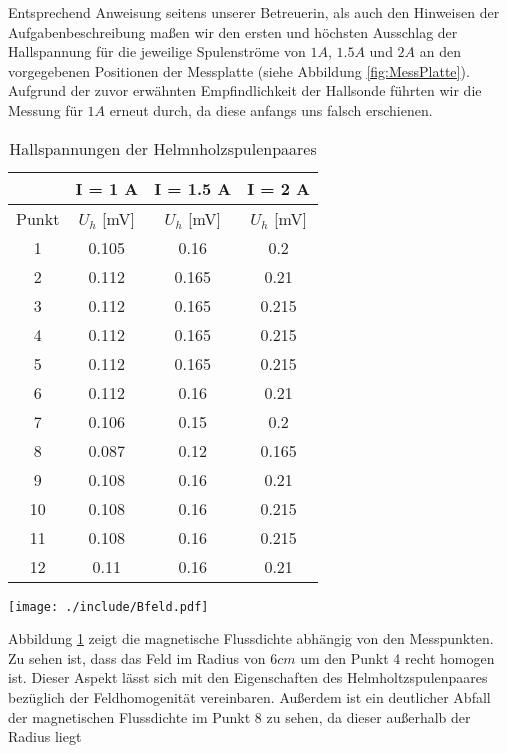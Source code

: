 Entsprechend Anweisung seitens unserer Betreuerin, als auch den Hinweisen der Aufgabenbeschreibung maßen wir den ersten und höchsten Ausschlag der Hallspannung für die jeweilige Spulenströme von $1 A$, $1.5 A$ und $2 A$ an den vorgegebenen Positionen der Messplatte (siehe Abbildung \ref{fig:MessPlatte}). Aufgrund der zuvor erwähnten  Empfindlichkeit der  Hallsonde führten wir die Messung für $1 A$ erneut durch, da diese anfangs uns falsch erschienen.


\newpage
 

\begin{table}
\begin{center}
\begin{tabular}{|c|c|c|c|}
\hline 
& I = 1 A & I = 1.5 A & I = 2 A \\ 
\hline 
Punkt & $U_h$ [mV] & $U_h$ [mV] & $U_h$ [mV] \\ 
\hline 
1 & 0.105 & 0.16 & 0.2 \\ 
\hline 
2 & 0.112 & 0.165 & 0.21 \\ 
\hline 
3 & 0.112 & 0.165 & 0.215 \\ 
\hline 
4 & 0.112 & 0.165 & 0.215 \\ 
\hline 
5 & 0.112 & 0.165 & 0.215 \\ 
\hline 
6 & 0.112 & 0.16 & 0.21 \\ 
\hline 
7 & 0.106 & 0.15 & 0.2 \\ 
\hline 
8 & 0.087 & 0.12 & 0.165 \\ 
\hline 
9 & 0.108 & 0.16 & 0.21 \\ 
\hline 
10 & 0.108 & 0.16 & 0.215 \\ 
\hline 
11 & 0.108 & 0.16 & 0.215 \\ 
\hline 
12 & 0.11 & 0.16 & 0.21 \\ 
\hline 
\end{tabular} 
\caption{Hallspannungen der Helmnholzspulenpaares}
\end{center}
\label{tab:Hallspanungen}
\end{table}

\begin{center}                                       
  \texttt{[image: ./include/Bfeld.pdf]} 
                          
\end{center} 

Abbildung \ref{tab:Hallspanungen} zeigt die magnetische Flussdichte abhängig von den Messpunkten. Zu sehen ist, dass das Feld im Radius von $6 cm$ um den Punkt 4 recht homogen ist. Dieser Aspekt lässt sich mit den Eigenschaften des Helmholtzspulenpaares bezüglich der Feldhomogenität vereinbaren. Außerdem ist ein deutlicher Abfall der magnetischen Flussdichte im Punkt 8 zu sehen, da dieser außerhalb der Radius liegt

